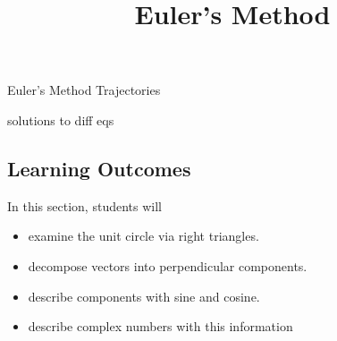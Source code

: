 \documentclass{ximera}
\title{Euler's Method}
\begin{document}
\begin{abstract}
\end{abstract}
\maketitle


Euler's Method
Trajectories

solutions to diff eqs





\subsection{Learning Outcomes}


\begin{sectionOutcomes}
In this section, students will 

\begin{itemize}
\item examine the unit circle via right triangles.
\item decompose vectors into perpendicular components.
\item describe components with sine and cosine.
\item describe complex numbers with this information
\end{itemize}
\end{sectionOutcomes}
\end{document}
